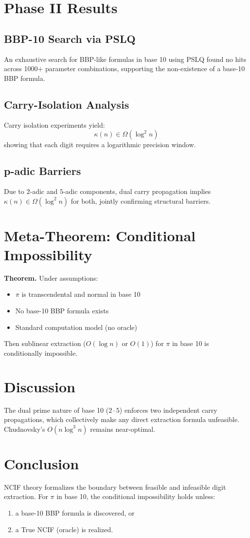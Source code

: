 \documentclass[12pt]{article}
\begin{document}
\section{Phase II Results}
\subsection{BBP-10 Search via PSLQ}
An exhaustive search for BBP-like formulas in base 10 using PSLQ found no hits across 1000+ parameter combinations, supporting the non-existence of a base-10 BBP formula.

\subsection{Carry-Isolation Analysis}
Carry isolation experiments yield:
\[
\kappa(n) \in \Omega(\log^2 n)
\]
showing that each digit requires a logarithmic precision window.

\subsection{p-adic Barriers}
Due to $2$-adic and $5$-adic components, dual carry propagation implies 
$\kappa(n) \in \Omega(\log^2 n)$ for both, jointly confirming structural barriers.

\section{Meta-Theorem: Conditional Impossibility}
\textbf{Theorem.}  
Under assumptions:
\begin{itemize}
\item $\pi$ is transcendental and normal in base 10
\item No base-10 BBP formula exists
\item Standard computation model (no oracle)
\end{itemize}
Then sublinear extraction ($O(\log n)$ or $O(1)$) for $\pi$ in base 10 is conditionally impossible.

\section{Discussion}
The dual prime nature of base 10 ($2 \cdot 5$) enforces two independent carry propagations, which collectively make any direct extraction formula unfeasible.  
Chudnovsky's $O(n \log^3 n)$ remains near-optimal.

\section{Conclusion}
NCIF theory formalizes the boundary between feasible and infeasible digit extraction.  
For $\pi$ in base 10, the conditional impossibility holds unless:
\begin{enumerate}
\item a base-10 BBP formula is discovered, or  
\item a True NCIF (oracle) is realized.
\end{enumerate}
\end{document}
